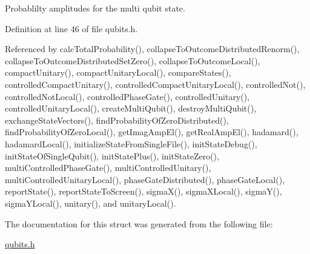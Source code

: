 Probablilty amplitudes for the multi qubit state. 

Definition at line 46 of file qubits.h.

Referenced by calcTotalProbability(), collapseToOutcomeDistributedRenorm(), collapseToOutcomeDistributedSetZero(), collapseToOutcomeLocal(), compactUnitary(), compactUnitaryLocal(), compareStates(), controlledCompactUnitary(), controlledCompactUnitaryLocal(), controlledNot(), controlledNotLocal(), controlledPhaseGate(), controlledUnitary(), controlledUnitaryLocal(), createMultiQubit(), destroyMultiQubit(), exchangeStateVectors(), findProbabilityOfZeroDistributed(), findProbabilityOfZeroLocal(), getImagAmpEl(), getRealAmpEl(), hadamard(), hadamardLocal(), initializeStateFromSingleFile(), initStateDebug(), initStateOfSingleQubit(), initStatePlus(), initStateZero(), multiControlledPhaseGate(), multiControlledUnitary(), multiControlledUnitaryLocal(), phaseGateDistributed(), phaseGateLocal(), reportState(), reportStateToScreen(), sigmaX(), sigmaXLocal(), sigmaY(), sigmaYLocal(), unitary(), and unitaryLocal().

The documentation for this struct was generated from the following file:\begin{DoxyCompactItemize}
\item 
\hyperlink{qubits_8h}{qubits.h}\end{DoxyCompactItemize}
